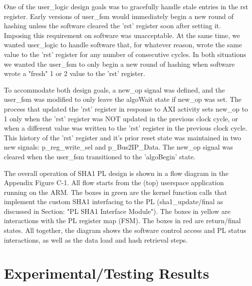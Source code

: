 \documentclass[journal]{IEEEtran}
\begin{document}
One of the user\_logic design goals was to gracefully handle stale entries in the rst register.  Early versions of user\_fsm would immediately begin a new round of hashing unless the software cleared the 'rst' register soon after setting it.  Imposing this requirement on software was unacceptable.  At the same time, we wanted user\_logic to handle software that, for whatever reason, wrote the same value to the 'rst' register for any number of consecutive cycles.  In both situations we wanted the user\_fsm to only begin a new round of hashing when software wrote a "fresh" 1 or 2 value to the 'rst' register.

To accommodate both design goals, a new\_op signal was defined, and the user\_fsm was modified to only leave the algoWait state if new\_op was set.  The process that updated the 'rst' register in response to AXI activity sets new\_op to 1 only when the 'rst' register was NOT updated in the previous clock cycle, or when a different value was written to the 'rst' register in the previous clock cycle.  This history of the 'rst' register and it's prior reset state was maintained in two new signals: p\_reg\_write\_sel and p\_Bus2IP\_Data.  The new\_op signal was cleared when the user\_fsm transitioned to the 'algoBegin' state.

The overall operation of SHA1 PL design is shown in a flow diagram in the Appendix Figure C-1. All flow starts from the (top) userspace application running on the ARM.  The boxes in green are the kernel function calls that implement the custom SHA1 interfacing to the PL (sha1\_update/final as discussed in Section: "PL SHA1 Interface Module").  The boxes in yellow are interactions with the PL register map (FSM).  The boxes in red are return/final states.  All together, the diagram shows the software control access and PL status interactions, as well as the data load and hash retrieval steps.

\section{Experimental/Testing Results}
\end{document}
